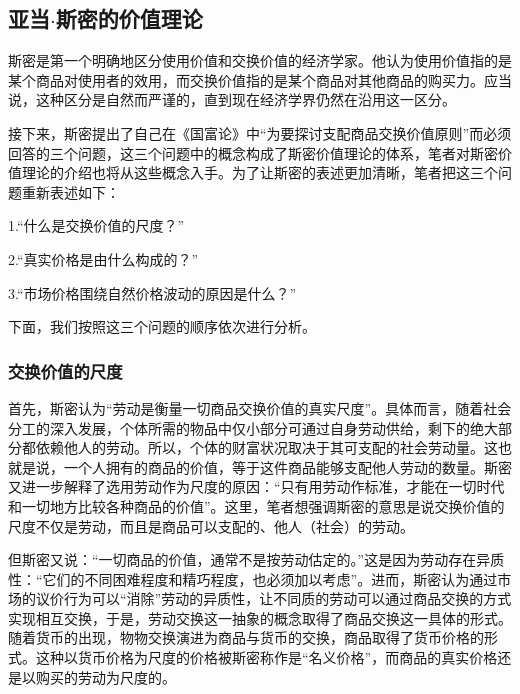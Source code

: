 \subsection{亚当$\cdot$斯密的价值理论}

斯密是第一个明确地区分使用价值和交换价值的经济学家\cite[122]{CaiJiMingCongGuDianZhengZhiJingJiXueDaoZhongGuoTeSeSheHuiZhuYiZhengZhiJingJiXueJiYuZhongGuoShiJiaoDeZhengZhiJingJiXueYanBianShangCe2023}。他认为使用价值指的是某个商品对使用者的效用，而交换价值指的是某个商品对其他商品的购买力\cite[24]{YaDang*SiMiGuoFuLun2015}。应当说，这种区分是自然而严谨的，直到现在经济学界仍然在沿用这一区分。

接下来，斯密提出了自己在《国富论》中“为要探讨支配商品交换价值原则”\cite[24]{YaDang*SiMiGuoFuLun2015}而必须回答的三个问题，这三个问题中的概念构成了斯密价值理论的体系，笔者对斯密价值理论的介绍也将从这些概念入手。为了让斯密的表述更加清晰，笔者把这三个问题重新表述如下：

1.“什么是交换价值的尺度？”\cite[24]{YaDang*SiMiGuoFuLun2015}

2.“真实价格是由什么构成的？”\cite[24]{YaDang*SiMiGuoFuLun2015}

3.“市场价格围绕自然价格波动的原因是什么？”\cite[24]{YaDang*SiMiGuoFuLun2015}

下面，我们按照这三个问题的顺序依次进行分析。

\subsubsection{交换价值的尺度}

首先，斯密认为“劳动是衡量一切商品交换价值的真实尺度”\Cite[25]{YaDang*SiMiGuoFuLun2015}。具体而言，随着社会分工的深入发展，个体所需的物品中仅小部分可通过自身劳动供给，剩下的绝大部分都依赖他人的劳动。所以，个体的财富状况取决于其可支配的社会劳动量\cite[25]{YaDang*SiMiGuoFuLun2015}。这也就是说，一个人拥有的商品的价值，等于这件商品能够支配他人劳动的数量\cite[25]{YaDang*SiMiGuoFuLun2015}。斯密又进一步解释了选用劳动作为尺度的原因：“只有用劳动作标准，才能在一切时代和一切地方比较各种商品的价值”\cite[31]{YaDang*SiMiGuoFuLun2015}。这里，笔者想强调斯密的意思是说交换价值的尺度不仅是劳动，而且是商品可以支配的、他人（社会）的劳动。

但斯密又说：“一切商品的价值，通常不是按劳动估定的。”\cite[26]{YaDang*SiMiGuoFuLun2015}这是因为劳动存在异质性：“它们的不同困难程度和精巧程度，也必须加以考虑”\cite[26]{YaDang*SiMiGuoFuLun2015}。进而，斯密认为通过市场的议价行为可以“消除”劳动的异质性，让不同质的劳动可以通过商品交换的方式实现相互交换，于是，劳动交换这一抽象的概念取得了商品交换这一具体的形式\cite[26]{YaDang*SiMiGuoFuLun2015}。随着货币的出现，物物交换演进为商品与货币的交换，商品取得了货币价格的形式。这种以货币价格为尺度的价格被斯密称作是“名义价格”，而商品的真实价格还是以购买的劳动为尺度的\cite[28]{YaDang*SiMiGuoFuLun2015}。

